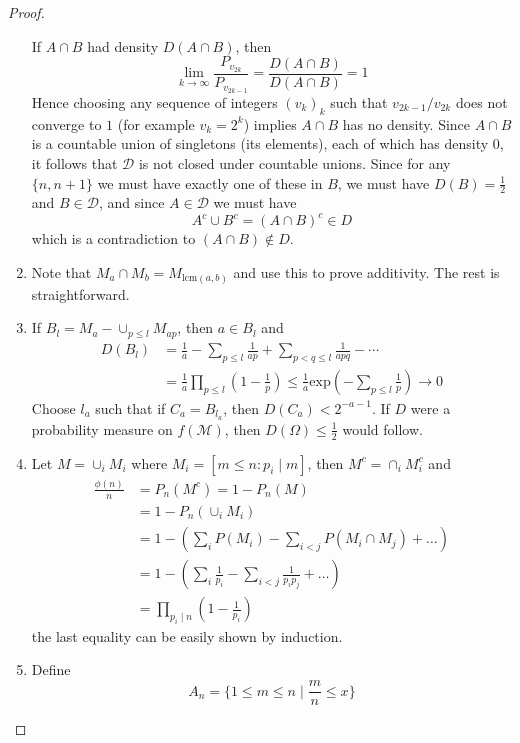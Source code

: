 \documentclass[11pt]{article}
\newcommand{\Om}{\Omega}
\newcommand{\mc}{\mathcal}
\newcommand{\un}{\cup}
\newcommand{\ic}{\cap}
\begin{document}
\begin{proof}
\begin{enumerate}
        If $A \ic B$ had density $D(A \ic B)$, then
        \[ \lim_{k \to \infty} \frac{P_{v_{2k}}}{P_{v_{2k-1}}} = \frac{D(A \ic B)}{D(A \ic B)} = 1 \]
        Hence choosing any sequence of integers $(v_k)_k$ such that $v_{2k-1}/v_{2k}$ does not converge to $1$ (for example $v_k = 2^k$) implies $A \ic B$ has no density. Since $A \ic B$ is a countable union of singletons (its elements), each of which has density $0$, it follows that $\mc D$ is not closed under countable unions. Since for any $\{ n, n+ 1 \}$ we must have exactly one of these in $B$, we must have $D(B) = \frac{1}{2}$ and $B \in \mc D$, and since $A \in \mc D$ we must have
        \[ A^c \un B^c = (A \ic B)^c \in D \]
        which is a contradiction to $(A \ic B) \notin D$.
        \item Note that $M_{a} \ic M_{b} = M_{\mathrm{lcm}(a,b)}$ and use this to prove additivity. The rest is straightforward.
        \item If $B_l = M_a - \cup_{p \leq l} M_{ap}$, then $a \in B_l$ and 
        \begin{align*}
            D(B_l) &= \frac{1}{a} - \sum_{p \leq l} \frac{1}{ap} + \sum_{p < q \leq l} \frac{1}{apq} - \cdots \\
            &= \frac{1}{a} \prod_{p \leq l} \left (1 - \frac{1}{p} \right) \leq \frac{1}{a} \mathrm{exp} \left ( - \sum_{p \leq l} \frac{1}{p} \right) \to 0
        \end{align*}
        Choose $l_a$ such that if $C_a = B_{l_a}$, then $D(C_a) < 2^{-a - 1}$. If $D$ were a probability measure on $f(\mc M)$, then $D(\Om) \leq \frac{1}{2}$ would follow.
        \item Let $M = \cup_i M_i$ where $M_i = [m \leq n : p_i \mid m]$, then $M^c = \cap_i M_i^c$ and
        \begin{align*}
            \frac{\phi(n)}{n} &= P_n (M^c) = 1 - P_n (M) \\
            &= 1 - P_n (\cup_i M_i) \\
            &= 1 - \left ( \sum_i P(M_i)  - \sum_{i < j} P(M_i \ic M_j) + \ldots \right) \\
            &= 1 - \left ( \sum_i \frac{1}{p_i} - \sum_{i < j} \frac{1}{p_i p_j} + \ldots \right ) \\
            &= \prod_{p_i \mid n} \left ( 1 - \frac{1}{p_i} \right )
        \end{align*}
        the last equality can be easily shown by induction.
        \item Define
        \[ A_n = \{ 1 \leq m \leq n \mid \frac{m}{n} \leq x \} \]

\end{enumerate}
\end{proof}
\end{document}

